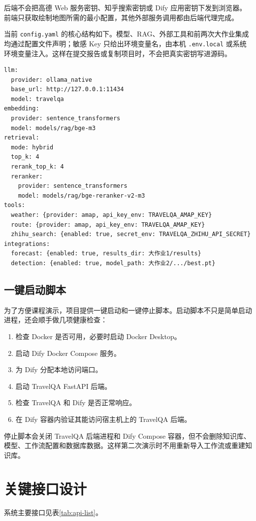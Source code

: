 \documentclass[bwprint]{report}
\begin{document}
后端不会把高德 Web 服务密钥、知乎搜索密钥或 Dify 应用密钥下发到浏览器。前端只获取绘制地图所需的最小配置，其他外部服务调用都由后端代理完成。

当前 \texttt{config.yaml} 的核心结构如下。模型、RAG、外部工具和前两次大作业集成均通过配置文件声明；敏感 Key 只给出环境变量名，由本机 \texttt{.env.local} 或系统环境变量注入。这样在提交报告或复制项目时，不会把真实密钥写进源码。

\begin{lstlisting}
llm:
  provider: ollama_native
  base_url: http://127.0.0.1:11434
  model: travelqa
embedding:
  provider: sentence_transformers
  model: models/rag/bge-m3
retrieval:
  mode: hybrid
  top_k: 4
  rerank_top_k: 4
  reranker:
    provider: sentence_transformers
    model: models/rag/bge-reranker-v2-m3
tools:
  weather: {provider: amap, api_key_env: TRAVELQA_AMAP_KEY}
  route: {provider: amap, api_key_env: TRAVELQA_AMAP_KEY}
  zhihu_search: {enabled: true, secret_env: TRAVELQA_ZHIHU_API_SECRET}
integrations:
  forecast: {enabled: true, results_dir: 大作业1/results}
  detection: {enabled: true, model_path: 大作业2/.../best.pt}
\end{lstlisting}

\subsection{一键启动脚本}
为了方便课程演示，项目提供一键启动和一键停止脚本。启动脚本不只是简单启动进程，还会顺手做几项健康检查：
\begin{enumerate}
    \item 检查 Docker 是否可用，必要时启动 Docker Desktop。
    \item 启动 Dify Docker Compose 服务。
    \item 为 Dify 分配本地访问端口。
    \item 启动 TravelQA FastAPI 后端。
    \item 检查 TravelQA 和 Dify 是否正常响应。
    \item 在 Dify 容器内验证其能访问宿主机上的 TravelQA 后端。
\end{enumerate}

停止脚本会关闭 TravelQA 后端进程和 Dify Compose 容器，但不会删除知识库、模型、工作流配置和数据库数据。这样第二次演示时不用重新导入工作流或重建知识库。

\section{关键接口设计}
系统主要接口见表\ref{tab:api-list}。
\end{document}
